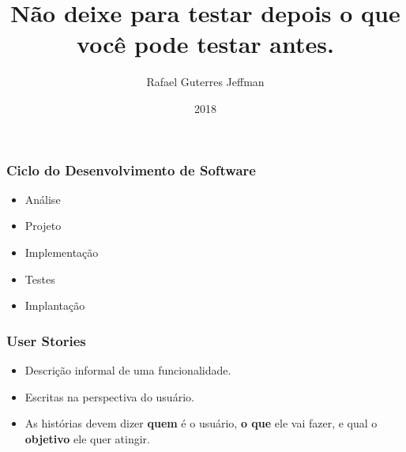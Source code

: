 


\usepackage{setspace}

\title{Não deixe para testar depois o que você pode testar antes.}
\author{Rafael Guterres Jeffman}
\date{2018}

\newcommand\bddfeature[2]{{\color{red}Feature: }{#1\\}{\hspace{1cm}#2\\}}
\newcommand\bddscenario[1]{{\color{blue!75!black}Scenario: }{#1\\}}
\newcommand\bddgiven[1]{{\color{green!50!black}Given }{#1\\}}
\newcommand\bddwhen[1]{{\color{green!50!black}When }{#1\\}}
\newcommand\bddthen[1]{{\color{green!50!black}Then }{#1\\}}
\newcommand\bddand[1]{{\color{green!50!black}And }{#1\\}}
\newcommand\bddbut[1]{{\color{green!50!black}But }{#1\\}}

\makeatletter
\preto{\@verbatim}{\topsep=0pt \partopsep=0pt}
\makeatother



\coverframe





\begin{frame}
    \frametitle{Ciclo do Desenvolvimento de Software}
    \begin{itemize}
        \item Análise
        \item Projeto
        \item Implementação
        \item Testes
        \item Implantação
    \end{itemize}
\end{frame}

\begin{frame}
    \frametitle{User Stories}
    \begin{itemize}
        \item Descrição informal de uma funcionalidade.
        \item Escritas na perspectiva do usuário.
        \item As histórias devem dizer \textbf{quem} é o usuário,
        \textbf{o que} ele vai fazer, e qual o \textbf{objetivo}
        ele quer atingir.
    \end{itemize}
\end{frame}

